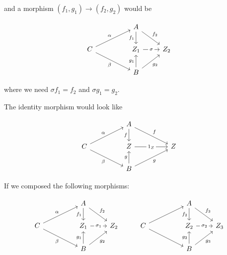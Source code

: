 and a morphism $(f_1, g_1) \rightarrow (f_2, g_2)$ would be

\[\begin{tikzcd}
	&& A \\
	C && {Z_1} & {Z_2} \\
	&& B
	\arrow["{f_1}"', from=1-3, to=2-3]
	\arrow["{f_2}", from=1-3, to=2-4]
	\arrow["\alpha", from=2-1, to=1-3]
	\arrow["\beta"', from=2-1, to=3-3]
	\arrow["\sigma"{description}, from=2-3, to=2-4]
	\arrow["{g_1}", from=3-3, to=2-3]
	\arrow["{g_2}"', from=3-3, to=2-4]
\end{tikzcd}\]

where we need $\sigma f_1 = f_2$ and $\sigma g_1 = g_2$.

The identity morphism would look like 

\[\begin{tikzcd}
	&& A \\
	C && Z && Z \\
	&& B
	\arrow["f"', from=1-3, to=2-3]
	\arrow["f", from=1-3, to=2-5]
	\arrow["\alpha", from=2-1, to=1-3]
	\arrow["\beta"', from=2-1, to=3-3]
	\arrow["{1_Z}"{description}, from=2-3, to=2-5]
	\arrow["g", from=3-3, to=2-3]
	\arrow["g"', from=3-3, to=2-5]
\end{tikzcd}\]

If we composed the following morphisms:

\[\begin{tikzcd}
	&& A &&&& A \\
	C && {Z_1} & {Z_2} & C && {Z_2} & {Z_3} \\
	&& B &&&& B
	\arrow["{f_1}"', from=1-3, to=2-3]
	\arrow["{f_2}", from=1-3, to=2-4]
	\arrow["{f_2}"', from=1-7, to=2-7]
	\arrow["{f_3}", from=1-7, to=2-8]
	\arrow["\alpha", from=2-1, to=1-3]
	\arrow["\beta"', from=2-1, to=3-3]
	\arrow["{\sigma_1}"{description}, from=2-3, to=2-4]
	\arrow[from=2-5, to=1-7]
	\arrow[from=2-5, to=3-7]
	\arrow["{\sigma_2}"{description}, from=2-7, to=2-8]
	\arrow["{g_1}", from=3-3, to=2-3]
	\arrow["{g_2}"', from=3-3, to=2-4]
	\arrow["{g_2}", from=3-7, to=2-7]
	\arrow["{g_3}"', from=3-7, to=2-8]
\end{tikzcd}\]

